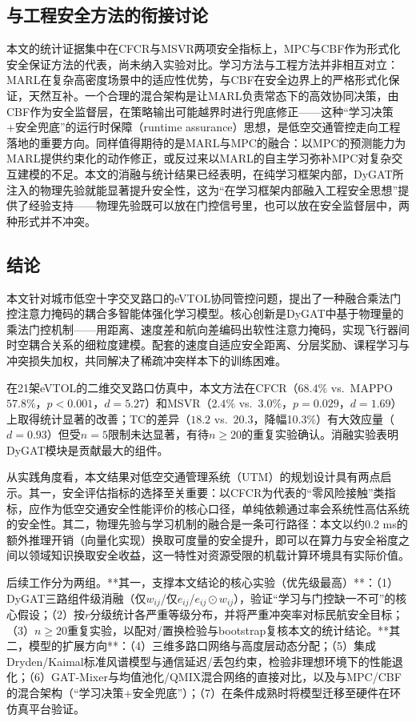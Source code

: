 \documentclass[12pt,a4paper,UTF8]{ctexart}
\begin{document}
\subsection{与工程安全方法的衔接讨论}

本文的统计证据集中在CFCR与MSVR两项安全指标上，MPC与CBF作为形式化安全保证方法的代表，尚未纳入实验对比。学习方法与工程方法并非相互对立：MARL在复杂高密度场景中的适应性优势，与CBF在安全边界上的严格形式化保证，天然互补。一个合理的混合架构是让MARL负责常态下的高效协同决策，由CBF作为安全监督层，在策略输出可能越界时进行兜底修正——这种“学习决策+安全兜底”的运行时保障（runtime assurance）思想，是低空交通管控走向工程落地的重要方向。同样值得期待的是MARL与MPC的融合：以MPC的预测能力为MARL提供约束化的动作修正，或反过来以MARL的自主学习弥补MPC对复杂交互建模的不足。本文的消融与统计结果已经表明，在纯学习框架内部，DyGAT所注入的物理先验就能显著提升安全性，这为“在学习框架内部融入工程安全思想”提供了经验支持——物理先验既可以放在门控信号里，也可以放在安全监督层中，两种形式并不冲突。

\subsection{结论}

本文针对城市低空十字交叉路口的eVTOL协同管控问题，提出了一种融合乘法门控注意力掩码的耦合多智能体强化学习模型。核心创新是DyGAT中基于物理量的乘法门控机制——用距离、速度差和航向差编码出软性注意力掩码，实现飞行器间时空耦合关系的细粒度建模。配套的速度自适应安全距离、分层奖励、课程学习与冲突损失加权，共同解决了稀疏冲突样本下的训练困难。

在21架eVTOL的二维交叉路口仿真中，本文方法在CFCR（$68.4\%$ vs.\ MAPPO $57.8\%$，$p<0.001$，$d=5.27$）和MSVR（$2.4\%$ vs.\ $3.0\%$，$p=0.029$，$d=1.69$）上取得统计显著的改善；TC的差异（$18.2$ vs.\ $20.3$，降幅10.3\%）有大效应量（$d=0.93$）但受$n=5$限制未达显著，有待$n\geq20$的重复实验确认。消融实验表明DyGAT模块是贡献最大的组件。

从实践角度看，本文结果对低空交通管理系统（UTM）的规划设计具有两点启示。其一，安全评估指标的选择至关重要：以CFCR为代表的“零风险接触”类指标，应作为低空交通安全性能评价的核心口径，单纯依赖通过率会系统性高估系统的安全性。其二，物理先验与学习机制的融合是一条可行路径：本文以约0.2 ms的额外推理开销（向量化实现）换取可度量的安全提升，即可以在算力与安全裕度之间以领域知识换取安全收益，这一特性对资源受限的机载计算环境具有实际价值。

后续工作分为两组。**其一，支撑本文结论的核心实验（优先级最高）**：（1）DyGAT三路组件级消融（仅$w_{ij}$/仅$e_{ij}$/$e_{ij}\odot w_{ij}$），验证“学习与门控缺一不可”的核心假设；（2）按$r$分级统计各严重等级分布，并将严重冲突率对标民航安全目标；（3）$n\geq20$重复实验，以配对/置换检验与bootstrap复核本文的统计结论。**其二，模型的扩展方向**：（4）三维多路口网络与高度层动态分配；（5）集成Dryden/Kaimal标准风谱模型与通信延迟/丢包约束，检验非理想环境下的性能退化；（6）GAT-Mixer与均值池化/QMIX混合网络的直接对比，以及与MPC/CBF的混合架构（“学习决策+安全兜底”）；（7）在条件成熟时将模型迁移至硬件在环仿真平台验证。
\end{document}
